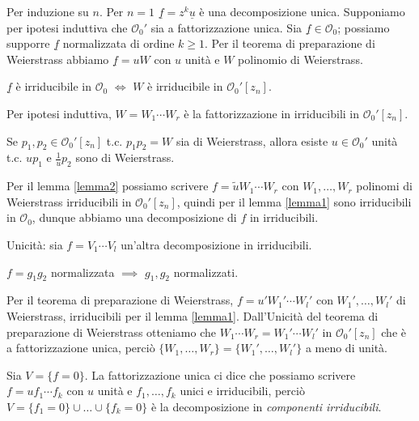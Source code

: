 \begin{thm}
  Per induzione su $n$. Per $n=1$ $\underline{f}=z^k\underline{u}$ è una decomposizione unica. Supponiamo per ipotesi induttiva che $\mathcal{O}_0'$ sia a fattorizzazione unica. Sia $\underline{f} \in \mathcal{O}_0$; possiamo supporre $\underline{f}$ normalizzata di ordine $k \ge 1$. Per il teorema di preparazione di Weierstrass abbiamo $\underline{f}=uW$ con $u$ unità e $W$ polinomio di Weierstrass.

  \begin{lm} \label{lemma1}
    $\underline{f}$ è irriducibile in $\mathcal{O}_0$ $\iff$ $W$ è irriducibile in $\mathcal{O}_0'[z_n]$.
  \end{lm}

  Per ipotesi induttiva, $W=W_1\cdots W_r$ è la fattorizzazione in irriducibili in $\mathcal{O}_0'[z_n]$.

  \begin{lm} \label{lemma2}
    Se $p_1, p_2 \in \mathcal{O}_0'[z_n]$ t.c. $p_1p_2=W$ sia di Weierstrass, allora esiste $u \in \mathcal{O}_0'$ unità t.c. $up_1$ e $\frac{1}{u}p_2$ sono di Weierstrass.
  \end{lm}

  Per il lemma \ref{lemma2} possiamo scrivere $f=\tilde{u}W_1\cdots W_r$ con $W_1, \dots, W_r$ polinomi di Weierstrass irriducibili in $\mathcal{O}_0'[z_n]$, quindi per il lemma \ref{lemma1} sono irriducibili in $\mathcal{O}_0$, dunque abbiamo una decomposizione di $f$ in irriducibili.

  Unicità: sia $f=V_1\cdots V_l$ un'altra decomposizione in irriducibili.

  \begin{lm} \label{lemma3}
    $f=g_1g_2$ normalizzata $\implies$ $g_1,g_2$ normalizzati.
  \end{lm}

  Per il teorema di preparazione di Weierstrass, $f=u'W_1'\cdots W_l'$ con $W_1', \dots, W_l'$ di Weierstrass, irriducibili per il lemma \ref{lemma1}. Dall'Unicità del teorema di preparazione di Weierstrass otteniamo che $W_1\cdots W_r=W_1'\cdots W_l'$ in $\mathcal{O}_0'[z_n]$ che è a fattorizzazione unica, perciò $\{W_1,\dots,W_r\}=\{W_1',\dots,W_l'\}$ a meno di unità.
\end{thm}

\begin{oss}
  Sia $V=\{f=0\}$. La fattorizzazione unica ci dice che possiamo scrivere $f=uf_1\cdots f_k$ con $u$ unità e $f_1, \dots, f_k$ unici e irriducibili, perciò $V=\{f_1=0\}\cup\dots\cup\{f_k=0\}$ è la decomposizione in \textit{componenti irriducibili}.
\end{oss}

